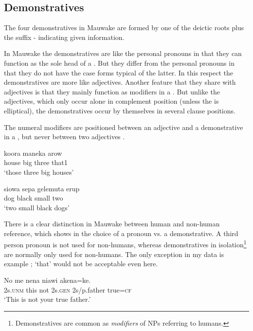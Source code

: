 \subsection{Demonstratives}\label{sec:3.6.2}
{}
The four demonstratives in Mauwake are formed by one of the deictic roots plus the suffix - indicating given information. 

In Mauwake the demonstratives are like the personal pronouns in that they can function as the sole head of a . But they differ from the personal pronouns in that they do not have the case forms typical of the latter. In this respect the demonstratives are more like adjectives. Another feature that they share with adjectives is that they mainly function as modifiers in a . But unlike the adjectives, which only occur alone in complement position (unless the  is elliptical), the demonstratives occur by themselves in several clause positions. 

The numeral modifiers are positioned between an adjective and a demonstrative in a  , but never between two adjectives .

\ea%
\label{ex:3:x631}
\gll koora maneka arow  \\
house big three that1\\
\glt`those three big houses'
\z

\ea%
\label{ex:3:x632}
\gll siowa sepa gelemuta erup \\
dog black small two\\
\glt`two small black dogs'
\z

There is a clear distinction in Mauwake between human and non-human reference, which shows in the choice of a pronoun vs. a demonstrative. A third person pronoun is not used for non-humans, whereas demonstratives in isolation\footnote{Demonstratives are common as \textit{modifiers} of NPs referring to humans.} are normally only used for non-humans. The only exception in my data is example ;  `that' would not be acceptable even here.

\ea%
\label{ex:3:x633}
\gll No{\footnotemark}  me nena niawi akena=ke. \\
2s.\textsc{unm} this not 2s.\textsc{gen} 2s/p.father true=\textsc{cf}\\
\glt`This is not your true father.'
\z

